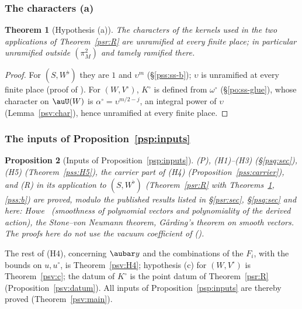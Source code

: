 \documentclass[10pt]{amsart}
\newtheorem{theorem}{Theorem}[section]
\newtheorem{proposition}[theorem]{Proposition}
\theoremstyle{definition}
\theoremstyle{remark}
\begin{document}
\subsubsection{The characters (a)}\label{pss:ss-a}

\begin{theorem}[Hypothesis (a)]\label{pss:a}
The characters of the kernels used in the two applications of Theorem~\ref{psr:R} are unramified at every
finite place; in particular unramified outside $(\pi_M^2)$ and tamely ramified there.
\end{theorem}
\begin{proof}
For $(S,W^\flat)$ they are $1$ and $\upsilon^m$ (\S\ref{pss:ss-b}); $\upsilon$ is unramified at every finite place
(proof of {\cite[Lemma~7.12]{P49}}). For $(W,V^\circ)$, $K^\circ$ is defined from $\omega^\circ$ (\S\ref{po:ss-glue}),
whose character on $\auU(W)$ is $\alpha^\circ=\upsilon^{m/2-j}$, an integral power of $\upsilon$ (Lemma~\ref{psv:char}),
hence unramified at every finite place.
\end{proof}

\subsubsection{The inputs of Proposition~\ref{psp:inputs}}\label{pss:ss-open}

\begin{proposition}[Inputs of Proposition~\ref{psp:inputs}]\label{pss:status}
\textup{(P)}, \textup{(H1)}--\textup{(H3)} (\S\ref{psq:sec}), \textup{(H5)} (Theorem~\ref{pss:H5}), the carrier part of
\textup{(H4)} (Proposition~\ref{pss:carrier}), and \textup{(R)} in its application to $(S,W^\flat)$
(Theorem~\ref{psr:R} with Theorems~\ref{pss:a}, \ref{pss:b}) are proved, modulo the published results listed
in \S\ref{psr:sec}, \S\ref{psq:sec} and here: Howe~\cite[(2.2)--(2.3)]{HoweJAMS} (smoothness of polynomial vectors and
polynomiality of the derived action), the Stone--von Neumann theorem, G\aa rding's theorem on smooth
vectors. The proofs here do not use the vacuum coefficient of {\cite[\S4.2.2]{P53}} ({\cite[Lemma~4.24]{P53}}).
\end{proposition}

\noindent The rest of (H4), concerning $\aubar y$ and the combinations of the $F_i$, with the bounds on $u,u^\circ$,
is Theorem~\ref{psv:H4}; hypothesis (c) for $(W,V^\circ)$ is Theorem~\ref{psv:c}; the datum of $K^\circ$ is the
point datum of Theorem~\ref{psr:R} (Proposition~\ref{psv:datum}). All inputs of Proposition~\ref{psp:inputs} are
thereby proved (Theorem~\ref{psv:main}).
\end{document}
